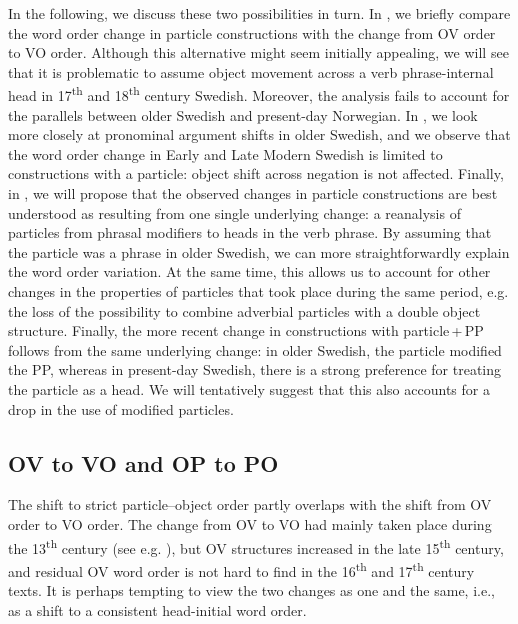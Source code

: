 \documentclass[output=paper]{langscibook}
\begin{document}
In the following, we discuss these two possibilities in turn. In , we briefly compare the word order change in particle constructions with the change from OV order to VO order. Although this alternative might seem initially appealing, we will see that it is problematic to assume object movement across a verb phrase-internal head in 17\textsuperscript{th} and 18\textsuperscript{th} century Swedish. Moreover, the analysis fails to account for the parallels between older Swedish and present-day Norwegian. In , we look more closely at pronominal argument shifts in older Swedish, and we observe that the word order change in Early and Late Modern Swedish is limited to constructions with a particle: object shift across negation is not affected. Finally, in , we will propose that the observed changes in particle constructions are best understood as resulting from one single underlying change: a reanalysis of particles from phrasal modifiers to heads in the verb phrase. By assuming that the particle was a phrase in older Swedish, we can more straightforwardly explain the word order variation. At the same time, this allows us to account for other changes in the properties of particles that took place during the same period, e.g. the loss of the possibility to combine adverbial particles with a double object structure. Finally, the more recent change in constructions with particle\,+\,PP follows from the same underlying change: in older Swedish, the particle modified the PP, whereas in present-day Swedish, there is a strong preference for treating the particle as a head. We will tentatively suggest that this also accounts for a drop in the use of modified particles.


\subsection{OV to VO and OP to PO}\label{sec:lalu:6.1}

The shift to strict particle–object order partly overlaps with the shift from OV order to VO order. The change from OV to VO had mainly taken place during the 13\textsuperscript{th} century (see e.g. \citealt{Delsing1999}), but OV structures increased in the late 15\textsuperscript{th} century, and residual OV word order is not hard to find in the 16\textsuperscript{th} and 17\textsuperscript{th} century texts. It is perhaps tempting to view the two changes as one and the same, i.e., as a shift to a consistent head-initial word order. 
\end{document}
